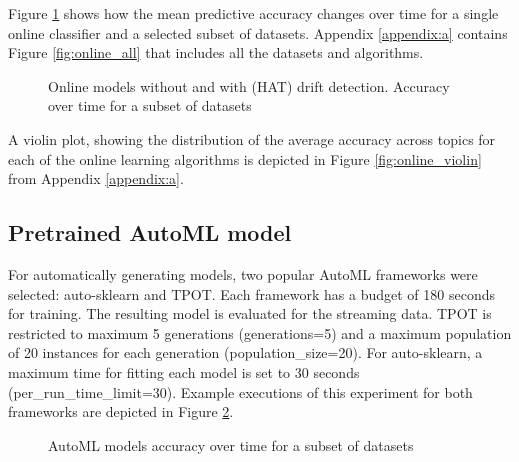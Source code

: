 \documentclass{sig-alternate-br}
\begin{document}
Figure \ref{fig:online_hat} shows how the mean predictive accuracy changes over time for a single online classifier and a selected subset of datasets. Appendix \ref{appendix:a} contains Figure \ref{fig:online_all} that includes all the datasets and algorithms.

\begin{figure}[h]
\centering 
{}
\end{figure}

\begin{figure}[h!]
\centering 
{}
\caption{Online models without and with (HAT) drift detection. Accuracy over time for a subset of datasets}
\label{fig:online_hat}
\end{figure}

A violin plot, showing the distribution of the average accuracy across topics for each of the online learning algorithms is depicted in Figure \ref{fig:online_violin} from Appendix \ref{appendix:a}.

\subsection{Pretrained AutoML model}

For automatically generating models, two popular \cite{gijsbers2019open} AutoML frameworks were selected: auto-sklearn and TPOT. Each framework has a budget of 180 seconds for training. The resulting model is evaluated for the streaming data. TPOT is restricted to maximum 5 generations (generations=5) and a maximum population of 20 instances for each generation (population\_size=20). For auto-sklearn, a maximum time for fitting each model is set to 30 seconds (per\_run\_time\_limit=30). Example executions of this experiment for both frameworks are depicted in Figure \ref{fig:automl_tpot}.

\begin{figure}[h]
\centering 
{}
\end{figure}

\begin{figure}[h!]
\centering 
{}
\caption{AutoML models accuracy over time for a subset of datasets}
\label{fig:automl_tpot}
\end{figure}
\end{document}
